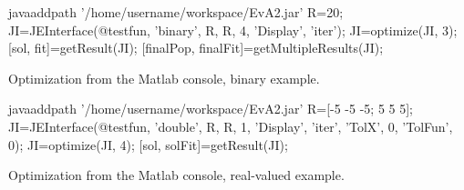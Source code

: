 \begin{algorithm}
\begin{mylstenv}
javaaddpath '/home/username/workspace/EvA2.jar'
R=20; 
JI=JEInterface(@testfun, 'binary', R, R, 4, 'Display', 'iter'); %
JI=optimize(JI, 3);  %
[sol, fit]=getResult(JI); 
[finalPop, finalFit]=getMultipleResults(JI);
\end{mylstenv}

\caption{Optimization from the Matlab console, binary example.\label{alg:Optimization-from-Matlab-binary}}
\end{algorithm}


\begin{algorithm}
\begin{mylstenv}
javaaddpath '/home/username/workspace/EvA2.jar'
R=[-5 -5 -5; 5 5 5];
JI=JEInterface(@testfun, 'double', R, R, 1, 'Display', 'iter', 'TolX', 0, 'TolFun', 0); 
JI=optimize(JI, 4);  %
[sol, solFit]=getResult(JI);
\end{mylstenv}

\caption{Optimization from the Matlab console, real-valued example.\label{alg:Optimization-from-Matlab-int.}}
\end{algorithm}
